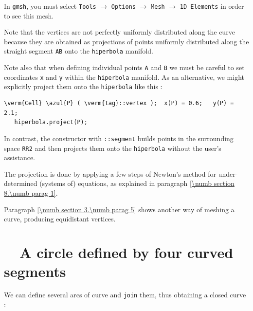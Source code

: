 In {\tt gmsh}, you must select {\small\tt Tools} $\to$ {\small\tt Options} $\to$
{\small\tt Mesh} $\to$ {\small\tt 1D Elements} in order to see this mesh.

Note that the vertices are not perfectly uniformly distributed along the curve
because they are obtained as projections of points uniformly distributed along
the straight segment {\small\tt AB} onto the {\small\tt hiperbola} manifold.

Note also that when defining individual points {\small\tt A} and {\small\tt B} we must
be careful to set coordinates {\small\tt x} and {\small\tt y} within
the {\small\tt hiperbola} manifold.
As an alternative, we might explicitly project them onto the {\small\tt hiperbola} like this :

\begin{Verbatim}[commandchars=\\\{\},formatcom=\small\tt,baselinestretch=0.94]
   \verm{Cell} \azul{P} ( \verm{tag}::vertex );  x(P) = 0.6;   y(P) = 2.1;
   hiperbola.project(P);
\end{Verbatim}

\noindent In contrast, the {\small\tt {}} constructor with {\small\tt {}::segment}
builds points in the surrounding space {\small\tt RR2} and then projects them onto the
{\small\tt hiperbola} without the user's assistance.

The projection is done by applying a few steps of Newton's method for under-determined
(systems of) equations, as explained in paragraph \ref{\numb section 8.\numb parag 1}.

Paragraph \ref{\numb section 3.\numb parag 5} shows another way of meshing a curve,
producing equidistant vertices.


\section{~~A circle defined by four curved segments}\label{\numb section 2.\numb parag 5}

We can define several arcs of curve and {\small\tt join} them, thus obtaining a closed curve :
\medskip


